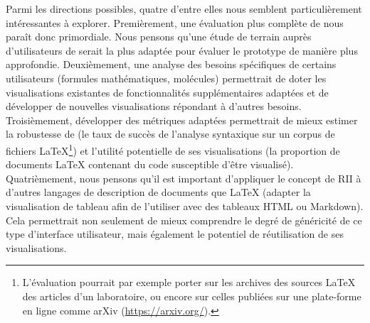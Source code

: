 Parmi les directions possibles, quatre d'entre elles nous semblent particulièrement intéressantes à explorer.
%
Premièrement, une évaluation plus complète de \iLaTeX{} nous paraît donc primordiale.
Nous pensons qu'une étude de terrain auprès d'utilisateurs de \iLaTeX{} serait la plus adaptée pour évaluer le prototype de manière plus approfondie.
%
Deuxièmement, une analyse des besoins spécifiques de certains utilisateurs (\eg formules mathématiques, molécules) permettrait de doter les visualisations existantes de fonctionnalités supplémentaires adaptées et de développer de nouvelles visualisations répondant à d'autres besoins.
%
Troisièmement, développer des métriques adaptées permettrait de mieux estimer la robustesse de \iLaTeX{} (\eg le taux de succès de l'analyse syntaxique sur un corpus de fichiers \LaTeX{}\footnote{L'évaluation pourrait par exemple porter sur les archives des sources \LaTeX{} des articles d'un laboratoire, ou encore sur celles publiées sur une plate-forme en ligne comme arXiv (\url{https://arxiv.org/}).}) et l'utilité potentielle de ses visualisations (\eg la proportion de documents \LaTeX{} contenant du code susceptible d'être visualisé).
%
Quatrièmement, nous pensons qu'il est important d'appliquer le concept de RII à d'autres langages de description de documents que \LaTeX{} (\eg adapter la visualisation de tableau afin de l'utiliser avec des tableaux HTML ou Markdown).
Cela permettrait non seulement de mieux comprendre le degré de généricité de ce type d'interface utilisateur, mais également le potentiel de réutilisation de ses visualisations.


% 
